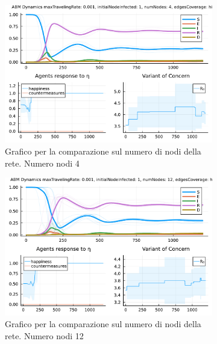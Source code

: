 \begin{figure}[!hb]
	\centering
	\begin{subfigure}[b]{0.45\textwidth}
		\centering
		\includegraphics[width=\textwidth]{img/SocialNetworkABM_1.pdf}
		\caption{Grafico per la comparazione sul numero di nodi della rete. Numero nodi 4}
		\label{fig:comparison_numberOfNodes_4}
	\end{subfigure}
	\hfill
	\begin{subfigure}[b]{0.45\textwidth}
		\centering
		\includegraphics[width=\textwidth]{img/SocialNetworkABM_17.pdf}
		\caption{Grafico per la comparazione sul numero di nodi della rete. Numero nodi 12}
		\label{fig:comparison_numberOfNodes_12}
	\end{subfigure}
	\hfill
	\begin{subfigure}[b]{0.45\textwidth}
		\centering

\end{subfigure}
\end{figure}
